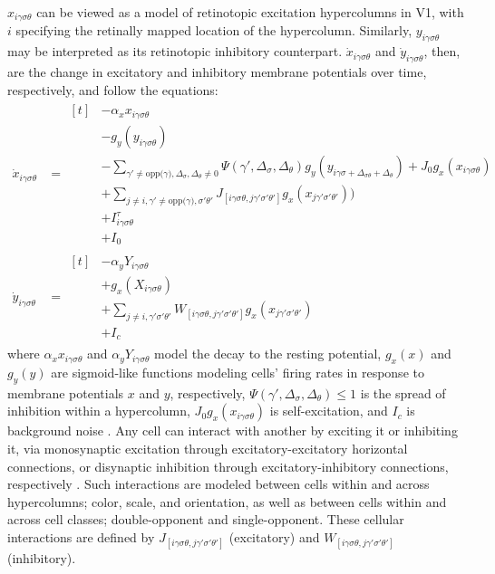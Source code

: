 \documentclass[journal,onecolumn]{IEEEtran}
\begin{document}
$x_{i\gamma\sigma\theta}$ can be viewed as a model of retinotopic excitation hypercolumns in V1, with $i$ specifying the retinally mapped location of the hypercolumn. Similarly, $y_{i\gamma\sigma\theta}$ may be interpreted as its retinotopic inhibitory counterpart. $\dot{x}_{i\gamma\sigma\theta}$ and $\dot{y}_{i\gamma\sigma\theta}$, then, are the change in excitatory and inhibitory membrane potentials over time, respectively, and follow the equations:
\begin{align}
    \dot{x}_{i\gamma\sigma\theta} &= \begin{aligned}[t]
        & - \alpha_{x}x_{i\gamma\sigma\theta} \label{eq:delta-x} \\
        & - g_y(y_{i\gamma\sigma\theta}) \\
        & - \sum\nolimits_{\gamma' \neq \text{opp($\gamma$)},\Delta_{\sigma},\Delta_{\theta} \neq 0}
            \Psi(\gamma',\Delta_{\sigma},\Delta_{\theta})
            g_y(y_{i\gamma\sigma + \Delta_{\sigma\theta} + \Delta_{\theta}})
            + J_0g_x(x_{i\gamma\sigma\theta}) \\
        & + \sum\nolimits_{j \neq i,\gamma' \neq \text{opp($\gamma$)},\sigma'\theta'}
            J_{[i\gamma\sigma\theta, j\gamma'\sigma'\theta']}g_x(x_{j\gamma'\sigma'\theta'})) \\
        & + I^\tau_{i\gamma\sigma\theta} \\
        & + I_0
        \end{aligned} \\
    \dot{y}_{i\gamma\sigma\theta} &= \begin{aligned}[t]
        & - \alpha_{y}Y_{i\gamma\sigma\theta} \label{eq:delta-y} \\
        & + g_x(X_{i\gamma\sigma\theta}) \\
        & + \sum\nolimits_{j \neq i, \gamma'\sigma'\theta'}
            W_{[i\gamma\sigma\theta, j\gamma'\sigma'\theta']}g_x(x_{j\gamma'\sigma'\theta'}) \\
        & + I_{c}
       \end{aligned}
\end{align}
where $\alpha_{x}x_{i\gamma\sigma\theta}$ and $\alpha_{y}Y_{i\gamma\sigma\theta}$ model the decay to the resting potential, $g_x(x)$ and $g_y(y)$ are sigmoid-like functions modeling cells' firing rates in response to membrane potentials $x$ and $y$, respectively, $\Psi(\gamma',\Delta_{\sigma},\Delta_{\theta}) \leq 1$ is the spread of inhibition within a hypercolumn, $J_0g_x(x_{i\gamma\sigma\theta})$ is self-excitation, and $I_c$ is background noise \cite{li:1999}.
Any cell can interact with another by exciting it or inhibiting it, via monosynaptic excitation through excitatory-excitatory horizontal connections, or disynaptic inhibition through excitatory-inhibitory connections, respectively \cite{penacchio:2013}. Such interactions are modeled between cells within and across hypercolumns; color, scale, and orientation, as well as between cells within and across cell classes; double-opponent and single-opponent. These cellular interactions are defined by $J_{[i\gamma\sigma\theta, j\gamma'\sigma'\theta']}$ (excitatory) and $W_{[i\gamma\sigma\theta, j\gamma'\sigma'\theta']}$ (inhibitory). 
\end{document}
